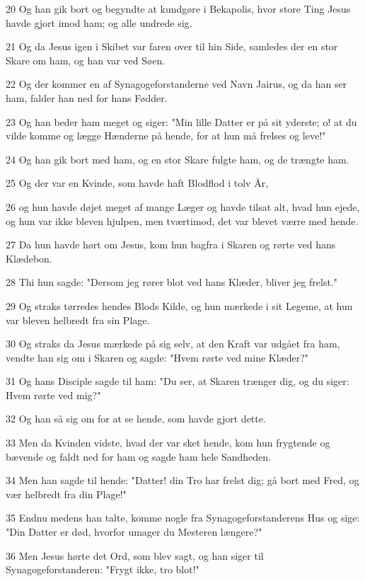 \par 20 Og han gik bort og begyndte at kundgøre i Bekapolis, hvor store Ting Jesus havde gjort imod ham; og alle undrede sig.
\par 21 Og da Jesus igen i Skibet var faren over til hin Side, samledes der en stor Skare om ham, og han var ved Søen.
\par 22 Og der kommer en af Synagogeforstanderne ved Navn Jairus, og da han ser ham, falder han ned for hans Fødder.
\par 23 Og han beder ham meget og siger: "Min lille Datter er på sit yderste; o! at du vilde komme og lægge Hænderne på hende, for at hun må frelses og leve!"
\par 24 Og han gik bort med ham, og en stor Skare fulgte ham, og de trængte ham.
\par 25 Og der var en Kvinde, som havde haft Blodflod i tolv År,
\par 26 og hun havde døjet meget af mange Læger og havde tilsat alt, hvad hun ejede, og hun var ikke bleven hjulpen, men tværtimod, det var blevet værre med hende.
\par 27 Da hun havde hørt om Jesus, kom hun bagfra i Skaren og rørte ved hans Klædebon.
\par 28 Thi hun sagde: "Dersom jeg rører blot ved hans Klæder, bliver jeg frelst."
\par 29 Og straks tørredes hendes Blods Kilde, og hun mærkede i sit Legeme, at hun var bleven helbredt fra sin Plage.
\par 30 Og straks da Jesus mærkede på sig selv, at den Kraft var udgået fra ham, vendte han sig om i Skaren og sagde: "Hvem rørte ved mine Klæder?"
\par 31 Og hans Disciple sagde til ham: "Du ser, at Skaren trænger dig, og du siger: Hvem rørte ved mig?"
\par 32 Og han så sig om for at se hende, som havde gjort dette.
\par 33 Men da Kvinden vidste, hvad der var sket hende, kom hun frygtende og bævende og faldt ned for ham og sagde ham hele Sandheden.
\par 34 Men han sagde til hende: "Datter! din Tro har frelst dig; gå bort med Fred, og vær helbredt fra din Plage!"
\par 35 Endnu medens han talte, komme nogle fra Synagogeforstanderens Hus og sige: "Din Datter er død, hvorfor umager du Mesteren længere?"
\par 36 Men Jesus hørte det Ord, som blev sagt, og han siger til Synagogeforstanderen: "Frygt ikke, tro blot!"

